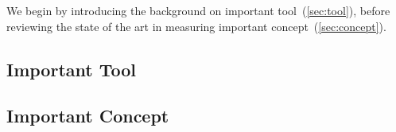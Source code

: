 We begin by introducing the background on important tool~(\autoref{sec:tool}), before reviewing the state of the art in measuring important concept~(\autoref{sec:concept}).

\subsection{Important Tool}
\label{sec:tool}

\lipsum[2-3]

\subsection{Important Concept}
\label{sec:concept}

\lipsum[2-3]
